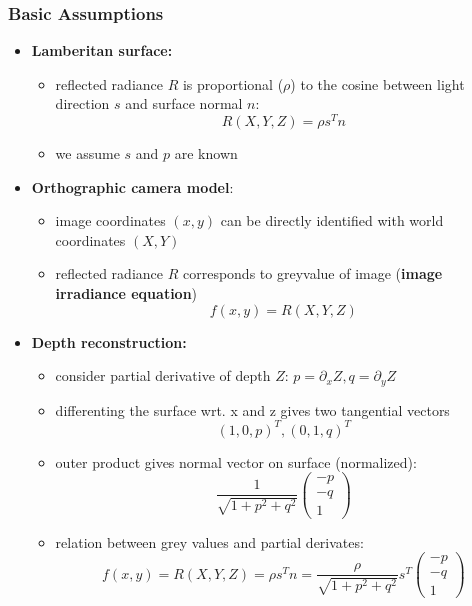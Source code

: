 \documentclass[11pt]{article}
\begin{document}
\subsubsection{Basic Assumptions}
\label{sec-6-3-2}
\begin{itemize}
\item \textbf{Lamberitan surface:}
\begin{itemize}
\item reflected radiance $R$ is proportional ($\rho$) to the cosine between light direction $s$
and surface normal $n$:
\[ R(X,Y,Z) = \rho s^Tn \]
\item we assume $s$ and $p$ are known
\end{itemize}
\item \textbf{Orthographic camera model}:
\begin{itemize}
\item image coordinates $(x,y)$ can be directly identified with world coordinates $(X,Y)$
\item reflected radiance $R$ corresponds to greyvalue of image (\textbf{image irradiance equation})
        \[ f(x,y) = R(X,Y,Z) \]
\end{itemize}
\item \textbf{Depth reconstruction:}
\begin{itemize}
\item consider partial derivative of depth $Z$: $p=\partial_x Z, q=\partial_y Z$
\item differenting the surface wrt. x and z gives two tangential vectors
        \[ (1,0,p)^T, (0,1,q)^T \]
\item outer product gives normal vector on surface (normalized):
        \[ \frac{1}{\sqrt{1+p^2+q^2}} \begin{pmatrix} -p \\ -q \\ 1 \end{pmatrix} \]
\item relation between grey values and partial derivates:
        \[ f(x,y) = R(X,Y,Z) = \rho s^T n = \frac{\rho}{\sqrt{1+p^2+q^2}} 
	   s^T \begin{pmatrix} -p \\ -q \\ 1 \end{pmatrix} \]
\end{itemize}
\end{itemize}
\end{document}
